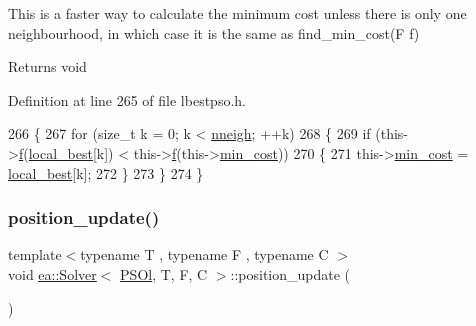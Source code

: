 This is a faster way to calculate the minimum cost unless there is only one neighbourhood, in which case it is the same as find\+\_\+min\+\_\+cost(\+F f) 

\begin{DoxyReturn}{Returns}
void 
\end{DoxyReturn}


Definition at line 265 of file lbestpso.\+h.


\begin{DoxyCode}
266     \{
267         \textcolor{keywordflow}{for} (\textcolor{keywordtype}{size\_t} k = 0; k < \hyperlink{classea_1_1_solver_3_01_p_s_ol_00_01_t_00_01_f_00_01_c_01_4_adb34cfcd87307ee2271b5aa5ffdd779d}{nneigh}; ++k)
268         \{
269             \textcolor{keywordflow}{if} (this->\hyperlink{classea_1_1_solver__base_ae0a893780c93dfe17c1d17301de6494f}{f}(\hyperlink{classea_1_1_solver_3_01_p_s_ol_00_01_t_00_01_f_00_01_c_01_4_a6671c3d551564e3b4cd0944bfb2c33fd}{local\_best}[k]) < this->\hyperlink{classea_1_1_solver__base_ae0a893780c93dfe17c1d17301de6494f}{f}(this->\hyperlink{classea_1_1_solver__base_af745cded954be26280d842c1e7c7f989}{min\_cost}))
270             \{
271                 this->\hyperlink{classea_1_1_solver__base_af745cded954be26280d842c1e7c7f989}{min\_cost} = \hyperlink{classea_1_1_solver_3_01_p_s_ol_00_01_t_00_01_f_00_01_c_01_4_a6671c3d551564e3b4cd0944bfb2c33fd}{local\_best}[k];
272             \}
273         \}
274     \}
\end{DoxyCode}
\mbox{\label{classea_1_1_solver_3_01_p_s_ol_00_01_t_00_01_f_00_01_c_01_4_a9f20cae513cb6a44dddc59ef43ee206f}} 
\subsubsection{\texorpdfstring{position\+\_\+update()}{position\_update()}}
{\footnotesize\ttfamily template$<$typename T , typename F , typename C $>$ \\
void \hyperlink{classea_1_1_solver}{ea\+::\+Solver}$<$ \hyperlink{structea_1_1_p_s_ol}{P\+S\+Ol}, T, F, C $>$\+::position\+\_\+update (\begin{DoxyParamCaption}{ }\end{DoxyParamCaption})\hspace{0.3cm}{\ttfamily [private]}}



